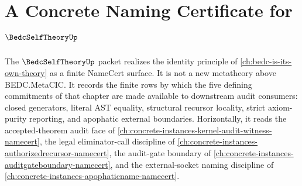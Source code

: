\chapter{A Concrete Naming Certificate for $\BedcSelfTheoryUp$}
\label{ch:concrete-instances-bedcselftheory-namecert}

The $\BedcSelfTheoryUp$ packet realizes the identity principle of \autoref{ch:bedc-is-its-own-theory} as a finite NameCert surface. It is not a new metatheory above BEDC.MetaCIC. It records the finite rows by which the five defining commitments of that chapter are made available to downstream audit consumers: closed generators, literal AST equality, structural recursor locality, strict axiom-purity reporting, and apophatic external boundaries. Horizontally, it reads the accepted-theorem audit face of \autoref{ch:concrete-instances-kernel-audit-witness-namecert}, the legal eliminator-call discipline of \autoref{ch:concrete-instances-authorizedrecursor-namecert}, the audit-gate boundary of \autoref{ch:concrete-instances-auditgateboundary-namecert}, and the external-socket naming discipline of \autoref{ch:concrete-instances-apophaticname-namecert}.

